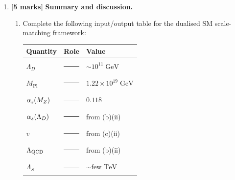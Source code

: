 \documentclass[11pt,a4paper]{article}
\begin{document}
\begin{enumerate}[label=(\alph*)]
    \begin{enumerate}[label=(\roman*)]
      \item Show that, up to $\mathcal{O}(1)$ factors,
        \begin{equation}\label{eq:fermi-seesaw}
          v \;\sim\; \frac{\Lambda_D^2}{M_{\text{Pl}}}\,.
        \end{equation}
        This is a \textbf{seesaw-like relation}: the electroweak
        hierarchy $v / M_{\text{Pl}} \sim 10^{-17}$ arises from the
        intermediate hierarchy
        $\Lambda_D / M_{\text{Pl}} \sim 10^{-8}$.

      \item For $\Lambda_D = 10^{11}\;\text{GeV}$ and
        $M_{\text{Pl}} = 1.22 \times 10^{19}\;\text{GeV}$, compute
        $v$ numerically from Eq.~\eqref{eq:fermi-seesaw}.  Compare
        with $v_{\text{measured}} = 246\;\text{GeV}$.

      \item Determine the range of $\Lambda_D$ that gives
        $v$ in the range $100$--$1000\;\text{GeV}$.

      \item Verify dimensional consistency:
        $[\Lambda_D^2 / M_{\text{Pl}}] = [\text{energy}]$.
    \end{enumerate}

  \item \textbf{[5 marks]}
    \textbf{Summary and discussion.}

    \begin{enumerate}[label=(\roman*)]
      \item Complete the following input/output table for the dualised
        SM scale-matching framework:

        \renewcommand{\arraystretch}{1.3}
        \begin{center}
        \begin{tabular}{@{} l l l @{}}
        \toprule
        \textbf{Quantity} & \textbf{Role} & \textbf{Value} \\
        \midrule
        $\Lambda_D$ & \rule{3cm}{0.4pt} & $\sim 10^{11}\;\text{GeV}$ \\
        $M_{\text{Pl}}$ & \rule{3cm}{0.4pt}
          & $1.22 \times 10^{19}\;\text{GeV}$ \\
        $\alpha_s(M_Z)$ & \rule{3cm}{0.4pt} & $0.118$ \\
        $\alpha_s(\Lambda_D)$ & \rule{3cm}{0.4pt} & from (b)(ii) \\
        $v$ & \rule{3cm}{0.4pt} & from (c)(ii) \\
        $\Lambda_{\mathrm{QCD}}$ & \rule{3cm}{0.4pt} & from (b)(ii) \\
        $\Lambda_S$ & \rule{3cm}{0.4pt} & $\sim \text{few TeV}$ \\
        \bottomrule
        \end{tabular}
        \end{center}


\end{enumerate}
\end{enumerate}
\end{document}
